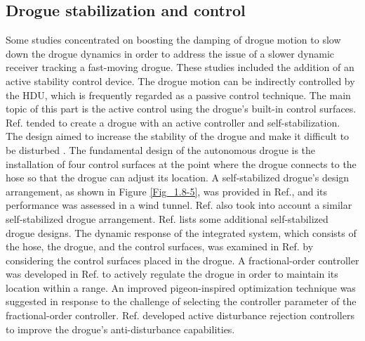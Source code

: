 \subsection{Drogue stabilization and control}

Some studies concentrated on boosting the damping of drogue motion
to slow down the drogue dynamics in order to address the issue of
a slower dynamic receiver tracking a fast-moving drogue. These studies
included the addition of an active stability control device. The drogue
motion can be indirectly controlled by the HDU, which is frequently
regarded as a passive control technique. The main topic of this part
is the active control using the drogue's built-in control surfaces.
Ref.\cite{pud-drogue} tended to create a drogue with an active controller
and self-stabilization. The design aimed to increase the stability
of the drogue and make it difficult to be disturbed\cite{pud-drogue}
\cite{kuk2013design}. The fundamental design of the autonomous drogue
is the installation of four control surfaces at the point where the
drogue connects to the hose so that the drogue can adjust its location.
A self-stabilized drogue's design arrangement, as shown in Figure
\ref{Fig_1.8-5}, was provided in Ref.\cite{kuk2013design}, and its
performance was assessed in a wind tunnel. Ref.\cite{yuan2017study}
also took into account a similar self-stabilized drogue arrangement.
Ref.\cite{AAR-2014} lists some additional self-stabilized drogue
designs. The dynamic response of the integrated system, which consists
of the hose, the drogue, and the control surfaces, was examined in
Ref.\cite{garcia2018dynamic} by considering the control surfaces
placed in the drogue. A fractional-order controller was developed
in Ref.\cite{sun2018fractional} to actively regulate the drogue in
order to maintain its location within a range. An improved pigeon-inspired
optimization technique was suggested in response to the challenge
of selecting the controller parameter of the fractional-order controller.
Ref.\cite{sun2022active} developed active disturbance rejection controllers
to improve the drogue's anti-disturbance capabilities. 

